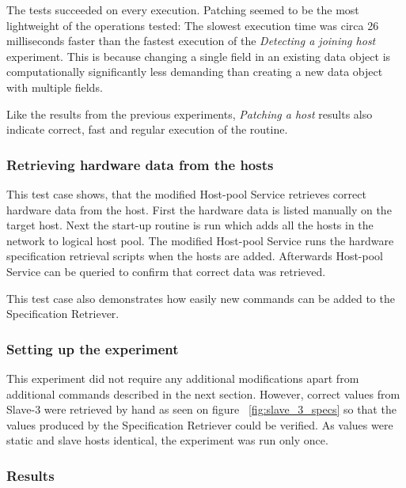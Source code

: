 The tests succeeded on every execution. Patching seemed to be the most lightweight of the operations tested: The slowest execution time was circa 26 milliseconds faster than the fastest execution of the \textit{Detecting a joining host} experiment. This is because changing a single field in an existing data object is computationally significantly less demanding than creating a new data object with multiple fields.

Like the results from the previous experiments, \textit{Patching a host} results also indicate correct, fast and regular execution of the routine.

\subsubsection{Retrieving hardware data from the hosts}

This test case shows, that the modified Host-pool Service retrieves correct hardware data from the host. First the hardware data is listed manually on the target host. Next the start-up routine is run which adds all the hosts in the network to logical host pool. The modified Host-pool Service runs the hardware specification retrieval scripts when the hosts are added. Afterwards Host-pool Service can be queried to confirm that correct data was retrieved.

This test case also demonstrates how easily new commands can be added to the Specification Retriever.

\subsubsection*{Setting up the experiment}

This experiment did not require any additional modifications apart from additional commands described in the next section. However, correct values from Slave-3 were retrieved by hand as seen on figure ~\ref{fig:slave_3_specs} so that the values produced by the Specification Retriever could be verified. As values were static and slave hosts identical, the experiment was run only once.

\subsubsection*{Results}

